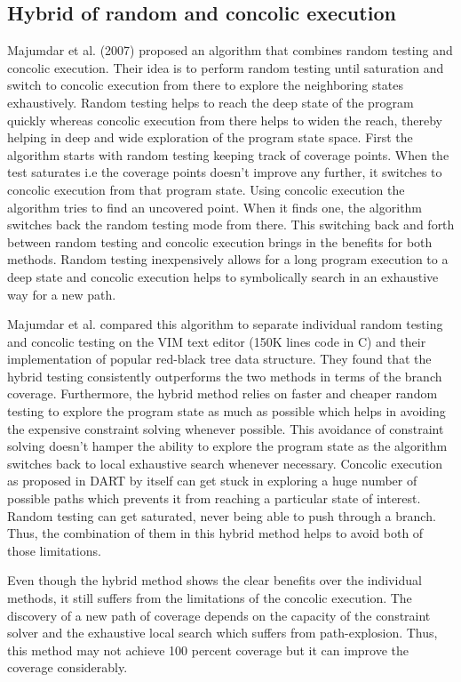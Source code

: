 \documentclass[ runningheads,
               a4paper]{llncs}
\begin{document}


\subsection{Hybrid of random and concolic execution}
Majumdar et al. (2007) \cite{majumdar2007hybrid} proposed an algorithm that combines random testing and concolic execution. Their idea is to perform random testing until saturation and switch to concolic execution from there to explore the neighboring states exhaustively. Random testing helps to reach the deep state of the program quickly whereas concolic execution from there helps to widen the reach, thereby helping in deep and wide exploration of the program state space. First the algorithm starts with random testing keeping track of coverage points. When the test saturates i.e the coverage points doesn't improve any further, it switches to concolic execution from that program state. Using concolic execution the algorithm tries to find an uncovered point. When it finds one, the algorithm switches back the random testing mode from there. This switching back and forth between random testing and concolic execution brings in the benefits for both methods. Random testing inexpensively allows for a long program execution to a deep state and concolic execution helps to symbolically search in an exhaustive way for a new path.


Majumdar et al. \cite{majumdar2007hybrid} compared this algorithm to separate individual random testing and concolic testing on the VIM text editor (150K lines code in C) and their implementation of popular red-black tree data structure. They found that the hybrid testing consistently outperforms the two methods in terms of the branch coverage. Furthermore, the hybrid method relies on faster and cheaper random testing to explore the program state as much as possible which helps in avoiding the expensive constraint solving whenever possible. This avoidance of constraint solving doesn't hamper the ability to explore the program state as the algorithm switches back to local exhaustive search whenever necessary. Concolic execution as proposed in DART \cite{godefroid2005dart} by itself can get stuck in exploring a huge number of possible paths which prevents it from reaching a particular state of interest. Random testing can get saturated, never being able to push through a branch. Thus, the combination of them in this hybrid method helps to avoid both of those limitations.


Even though the hybrid method shows the clear benefits over the individual methods, it still suffers from the limitations of the concolic execution. The discovery of a new path of coverage depends on the capacity of the constraint solver and the exhaustive local search which suffers from path-explosion. Thus, this method may not achieve 100 percent coverage but it can improve the coverage considerably.
\end{document}

